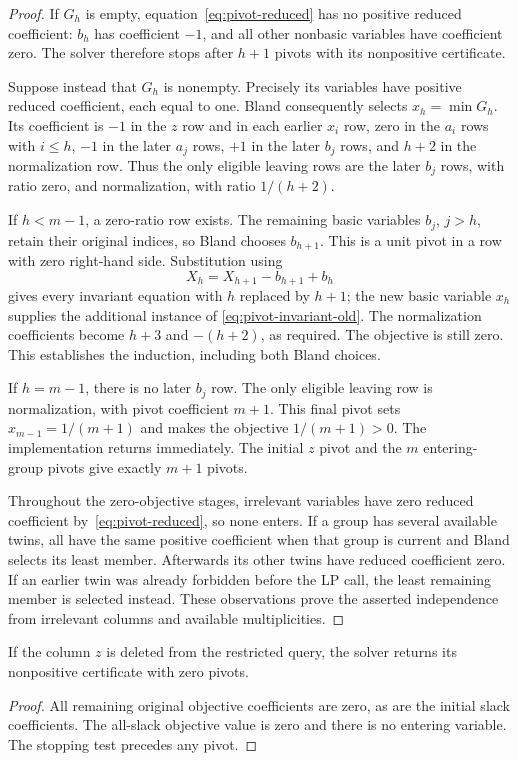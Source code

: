 \begin{proof}
If $G_h$ is empty, equation~\eqref{eq:pivot-reduced} has no positive
reduced coefficient: $b_h$ has coefficient $-1$, and all other nonbasic
variables have coefficient zero. The solver therefore stops after
$h+1$ pivots with its nonpositive certificate.

Suppose instead that $G_h$ is nonempty. Precisely its variables have
positive reduced coefficient, each equal to one. Bland consequently
selects $x_h=\min G_h$. Its coefficient is $-1$ in the $z$ row and in
each earlier $x_i$ row, zero in the $a_i$ rows with $i\le h$, $-1$ in
the later $a_j$ rows, $+1$ in the later $b_j$ rows, and $h+2$ in the
normalization row. Thus the only eligible leaving rows are the later
$b_j$ rows, with ratio zero, and normalization, with ratio $1/(h+2)$.

If $h<m-1$, a zero-ratio row exists. The remaining basic variables
$b_j$, $j>h$, retain their original indices, so Bland chooses $b_{h+1}$.
This is a unit pivot in a row with zero right-hand side. Substitution
using
\[
 X_h=X_{h+1}-b_{h+1}+b_h
\]
gives every invariant equation with $h$ replaced by $h+1$; the new basic
variable $x_h$ supplies the additional instance of
\eqref{eq:pivot-invariant-old}. The normalization coefficients become
$h+3$ and $-(h+2)$, as required. The objective is still zero. This
establishes the induction, including both Bland choices.

If $h=m-1$, there is no later $b_j$ row. The only eligible leaving row
is normalization, with pivot coefficient $m+1$. This final pivot sets
$x_{m-1}=1/(m+1)$ and makes the objective $1/(m+1)>0$.
The implementation returns immediately. The initial $z$ pivot and the
$m$ entering-group pivots give exactly $m+1$ pivots.

Throughout the zero-objective stages, irrelevant variables have zero
reduced coefficient by~\eqref{eq:pivot-reduced}, so none enters.
If a group has several available twins, all have the same positive
coefficient when that group is current and Bland selects its least member.
Afterwards its other twins have reduced coefficient zero. If an earlier
twin was already forbidden before the LP call, the least remaining
member is selected instead. These observations prove the asserted
independence from irrelevant columns and available multiplicities.
\end{proof}

\begin{lemma}\label{lem:pivot-zero-objective}
If the column $z$ is deleted from the restricted query, the solver returns
its nonpositive certificate with zero pivots.
\end{lemma}
\begin{proof}
All remaining original objective coefficients are zero, as are the initial
slack coefficients. The all-slack objective value is zero and there is no
entering variable. The stopping test precedes any pivot.
\end{proof}

